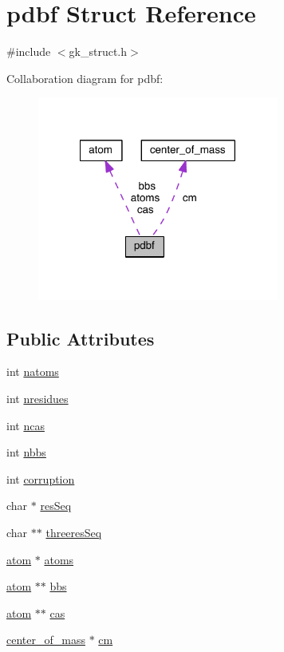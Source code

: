 \hypertarget{structpdbf}{}\section{pdbf Struct Reference}
\label{structpdbf}


{\ttfamily \#include $<$gk\+\_\+struct.\+h$>$}



Collaboration diagram for pdbf\+:\nopagebreak
\begin{figure}[H]
\begin{center}
\leavevmode
\includegraphics[width=225pt]{structpdbf__coll__graph}
\end{center}
\end{figure}
\subsection*{Public Attributes}
\begin{DoxyCompactItemize}
\item 
int \hyperlink{structpdbf_a6752def7d72ee73480a9fad514e60aef}{natoms}
\item 
int \hyperlink{structpdbf_a4172474fbba5b2127ab8e3184c63a059}{nresidues}
\item 
int \hyperlink{structpdbf_a7d28e61b01058ba61fb34b7b4b50e044}{ncas}
\item 
int \hyperlink{structpdbf_a9d9dbad94b94f067e3ab58334c9e892f}{nbbs}
\item 
int \hyperlink{structpdbf_af233eba06a2f4916dc76af49e447a013}{corruption}
\item 
char $\ast$ \hyperlink{structpdbf_a6be2fde75925c5a1064dfecd700dc79f}{res\+Seq}
\item 
char $\ast$$\ast$ \hyperlink{structpdbf_a2d79aa1e5f0634b5e4ceb22d1b2f2462}{threeres\+Seq}
\item 
\hyperlink{structatom}{atom} $\ast$ \hyperlink{structpdbf_aa582271e2b7d1d659f86ee27846d7a96}{atoms}
\item 
\hyperlink{structatom}{atom} $\ast$$\ast$ \hyperlink{structpdbf_af61e2b265a60d64feed10fd0ab7258a2}{bbs}
\item 
\hyperlink{structatom}{atom} $\ast$$\ast$ \hyperlink{structpdbf_a8fe8603ea76642263584103b2f574306}{cas}
\item 
\hyperlink{structcenter__of__mass}{center\+\_\+of\+\_\+mass} $\ast$ \hyperlink{structpdbf_a2124a322f26cb63ebaebe107a55c6f17}{cm}
\end{DoxyCompactItemize}


